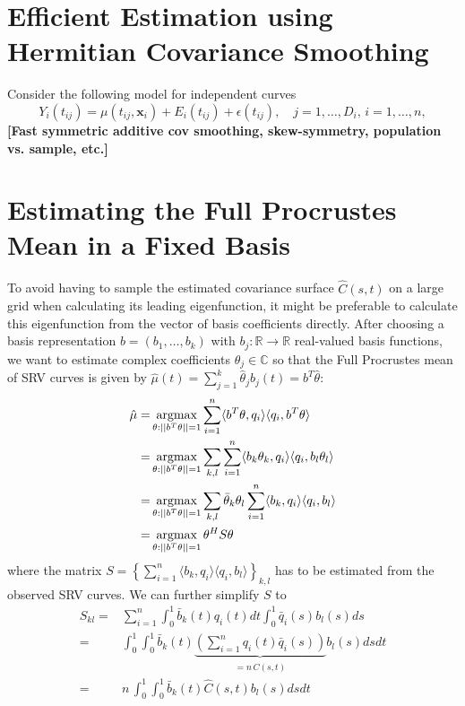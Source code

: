 

\section{Efficient Estimation using Hermitian Covariance Smoothing}
Consider the following model for independent curves
\begin{equation}
    Y_i(t_{ij}) = \mu(t_{ij}, \mathbf{x}_i) + E_i(t_{ij}) + \epsilon(t_{ij}),
    \quad j = 1,\dots,D_i, \, i = 1,\dots,n,
\end{equation}
\textbf{[Fast symmetric additive cov smoothing, skew-symmetry, population vs. sample, etc.]}


\section{Estimating the Full Procrustes Mean in a Fixed Basis}
To avoid having to sample the estimated covariance surface $\hat{C}(s,t)$ on a large grid when calculating its leading eigenfunction, it might be preferable to calculate this eigenfunction from the vector of basis coefficients directly.
After choosing a basis representation $b = (b_1, \dots, b_k)$ with $b_j : \mathbb{R} \rightarrow \mathbb{R}$ real-valued basis functions, we want to estimate complex coefficients $\theta_j \in \mathbb{C}$ so that the Full Procrustes mean of SRV curves is given by $\hat{\mu}(t) = \sum_{j=1}^k \hat{\theta}_j b_j(t) = b^T \hat{\theta}$:
\begin{align*}
    \hat{\mu} =& \operatorname*{argmax}_{\theta : ||b^T\theta||=1} \sum_{i=1}^n \langle b^T\theta, q_i \rangle \langle q_i, b^T\theta \rangle \\
    =& \operatorname*{argmax}_{\theta : ||b^T\theta||=1} \sum_{k,l} \sum_{i=1}^n \langle b_k \theta_k, q_i \rangle \langle q_i, b_l \theta_l \rangle \\
    =& \operatorname*{argmax}_{\theta : ||b^T\theta||=1} \sum_{k,l} \bar{\theta}_k \theta_l \sum_{i=1}^n \langle b_k, q_i \rangle \langle q_i, b_l \rangle \\
    =& \operatorname*{argmax}_{\theta : ||b^T\theta||=1} \theta^H S \theta \\
\end{align*}
where the matrix $S = \left\{ \sum_{i=1}^n \langle b_k, q_i \rangle \langle q_i, b_l \rangle \right\}_{k,l}$ has to be estimated from the observed SRV curves.
We can further simplify $S$ to
\begin{align*}
    S_{kl} =& \sum_{i=1}^n \int_0^1 \bar{b}_k(t) q_i(t) dt \int_0^1 \bar{q}_i(s) b_l(s) ds \\
    =& \int_0^1 \int_0^1 \bar{b}_k(t) \underbrace{\left( \sum_{i=1}^n q_i(t) \bar{q}_i(s) \right)}_{= n \, \hat{C}(s,t)} b_l(s) ds dt\\
    =& n \, \int_0^1 \int_0^1 \bar{b}_k(t) \hat{C}(s,t) b_l(s) ds dt\\
\end{align*}
